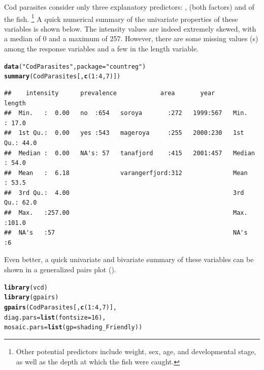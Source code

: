 \documentclass[11pt]{book}\usepackage[]{graphicx}\usepackage[]{color}
\makeatletter
\newcommand{\hlnum}[1]{\textcolor[rgb]{0.686,0.059,0.569}{#1}}%
\newcommand{\hlstr}[1]{\textcolor[rgb]{0.192,0.494,0.8}{#1}}%
\newcommand{\hlopt}[1]{\textcolor[rgb]{0,0,0}{#1}}%
\newcommand{\hlstd}[1]{\textcolor[rgb]{0.345,0.345,0.345}{#1}}%
\newcommand{\hlkwc}[1]{\textcolor[rgb]{0.333,0.667,0.333}{#1}}%
\newcommand{\hlkwd}[1]{\textcolor[rgb]{0.737,0.353,0.396}{\textbf{#1}}}%
\newenvironment{kframe}{%
 \def\at@end@of@kframe{}%
 \ifinner\ifhmode%
  \def\at@end@of@kframe{\end{minipage}}%
  \begin{minipage}{\columnwidth}%
 \fi\fi%
 \def\FrameCommand##1{\hskip\@totalleftmargin \hskip-\fboxsep
 \colorbox{shadecolor}{##1}\hskip-\fboxsep
     \hskip-\linewidth \hskip-\@totalleftmargin \hskip\columnwidth}%
 \MakeFramed {\advance\hsize-\width
   \@totalleftmargin\z@ \linewidth\hsize
   \@setminipage}}%
 {\par\unskip\endMakeFramed%
 \at@end@of@kframe}
\newenvironment{knitrout}{}{} %
\renewenvironment{knitrout}{\small\renewcommand{\baselinestretch}{.85}}{} %
\makeatother
\begin{document}
\begin{Example}[cod1]{Cod parasites}
\citet{Hemmingsen-etal:2005} consider only three explanatory predictors: , 
(both factors) and  of the fish.%
\footnote{
Other potential predictors include weight, sex, age, and developmental stage, as well as the
depth at which the fish were caught.
}
A quick numerical summary of the univariate properties of these variables is shown below.
The intensity values are indeed extremely skewed, with a median of 0 and a maximum of 257.
However, there are some missing values (s) among the response variables and 
a few in the length variable.
\begin{knitrout}\footnotesize
{}\color{fgcolor}\begin{kframe}
\begin{alltt}
\hlkwd{data}\hlstd{(}\hlstr{"CodParasites"}\hlstd{,} \hlkwc{package} \hlstd{=} \hlstr{"countreg"}\hlstd{)}
\hlkwd{summary}\hlstd{(CodParasites[,} \hlkwd{c}\hlstd{(}\hlnum{1}\hlopt{:}\hlnum{4}\hlstd{,}\hlnum{7}\hlstd{)])}
\end{alltt}
\begin{verbatim}
##    intensity      prevalence            area       year         length     
##  Min.   :  0.00   no  :654   soroya       :272   1999:567   Min.   : 17.0  
##  1st Qu.:  0.00   yes :543   mageroya     :255   2000:230   1st Qu.: 44.0  
##  Median :  0.00   NA's: 57   tanafjord    :415   2001:457   Median : 54.0  
##  Mean   :  6.18              varangerfjord:312              Mean   : 53.5  
##  3rd Qu.:  4.00                                             3rd Qu.: 62.0  
##  Max.   :257.00                                             Max.   :101.0  
##  NA's   :57                                                 NA's   :6
\end{verbatim}
\end{kframe}
\end{knitrout}

Even better, a quick univariate and bivariate summary of these variables can be shown in a generalized pairs plot
().
\begin{knitrout}
\color{fgcolor}\begin{kframe}
\begin{alltt}
\hlkwd{library}\hlstd{(vcd)}
\hlkwd{library}\hlstd{(gpairs)}
\hlkwd{gpairs}\hlstd{(CodParasites[,} \hlkwd{c}\hlstd{(}\hlnum{1}\hlopt{:}\hlnum{4}\hlstd{,}\hlnum{7}\hlstd{)],}
       \hlkwc{diag.pars}\hlstd{=}\hlkwd{list}\hlstd{(}\hlkwc{fontsize}\hlstd{=}\hlnum{16}\hlstd{),}
       \hlkwc{mosaic.pars}\hlstd{=}\hlkwd{list}\hlstd{(}\hlkwc{gp}\hlstd{=shading_Friendly))}
\end{alltt}
\end{kframe}\begin{figure}[htb!]



\end{figure}
\end{knitrout}
\end{Example}
\end{document}
